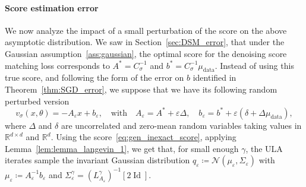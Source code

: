 \documentclass[11pt]{article}
\newcommand{\eqdef}{\coloneqq}
\newcommand{\id}{\operatorname{Id}}
\begin{document}
\paragraph{Score estimation error} We now analyze the impact of a small perturbation of the score on the above asymptotic distribution. We saw in Section~\ref{sec:DSM_error}, that under the Gaussian assumption~\ref{ass:gaussian}, the optimal score for the denoising score matching loss corresponds to $A^* = C_\sigma^{-1}$ and $b^* = C_\sigma^{-1} \mu_\mathrm{data}$. Instead of using this true score, and following the form of the error on $b$ identified in Theorem~\ref{thm:SGD_error}, we suppose that we have its following random perturbed version 
\begin{equation} \label{eq:gen_inexact_score}
    v_\sigma(x, \theta) = - A_\varepsilon x + b_\varepsilon, \quad \text{with}\quad 
    A_\varepsilon = A^* + \varepsilon \Delta, \quad b_\varepsilon = b^* + \varepsilon (\delta + \Delta \mu_\mathrm{data}),
\end{equation}
where \(\Delta\) and \(\delta\) are uncorrelated and zero-mean random variables taking values in $\mathbb{R}^{d \times d}$ and $\mathbb{R}^{d}$.
Using the score~\eqref{eq:gen_inexact_score}, applying Lemma~\ref{lem:lemma_langevin_1}, we get that, for small enough $\gamma$, the ULA iterates sample the invariant Gaussian distribution $q_\varepsilon \eqdef \mathcal{N}(\mu_\varepsilon, \Sigma_\varepsilon)$ with $\mu_\varepsilon \eqdef A_\varepsilon^{-1} b_\varepsilon$ and $\Sigma^\gamma_\varepsilon = (L^\gamma_{A_\varepsilon})^{-1}[2\id]$.
\end{document}
